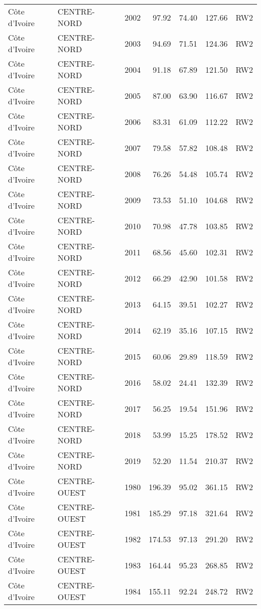 \begin{longtable}{lllrrrl}
  C\^{o}te d'Ivoire & CENTRE-NORD & 2002 & 97.92 & 74.40 & 127.66 & RW2 \\ 
  C\^{o}te d'Ivoire & CENTRE-NORD & 2003 & 94.69 & 71.51 & 124.36 & RW2 \\ 
  C\^{o}te d'Ivoire & CENTRE-NORD & 2004 & 91.18 & 67.89 & 121.50 & RW2 \\ 
  C\^{o}te d'Ivoire & CENTRE-NORD & 2005 & 87.00 & 63.90 & 116.67 & RW2 \\ 
  C\^{o}te d'Ivoire & CENTRE-NORD & 2006 & 83.31 & 61.09 & 112.22 & RW2 \\ 
  C\^{o}te d'Ivoire & CENTRE-NORD & 2007 & 79.58 & 57.82 & 108.48 & RW2 \\ 
  C\^{o}te d'Ivoire & CENTRE-NORD & 2008 & 76.26 & 54.48 & 105.74 & RW2 \\ 
  C\^{o}te d'Ivoire & CENTRE-NORD & 2009 & 73.53 & 51.10 & 104.68 & RW2 \\ 
  C\^{o}te d'Ivoire & CENTRE-NORD & 2010 & 70.98 & 47.78 & 103.85 & RW2 \\ 
  C\^{o}te d'Ivoire & CENTRE-NORD & 2011 & 68.56 & 45.60 & 102.31 & RW2 \\ 
  C\^{o}te d'Ivoire & CENTRE-NORD & 2012 & 66.29 & 42.90 & 101.58 & RW2 \\ 
  C\^{o}te d'Ivoire & CENTRE-NORD & 2013 & 64.15 & 39.51 & 102.27 & RW2 \\ 
  C\^{o}te d'Ivoire & CENTRE-NORD & 2014 & 62.19 & 35.16 & 107.15 & RW2 \\ 
  C\^{o}te d'Ivoire & CENTRE-NORD & 2015 & 60.06 & 29.89 & 118.59 & RW2 \\ 
  C\^{o}te d'Ivoire & CENTRE-NORD & 2016 & 58.02 & 24.41 & 132.39 & RW2 \\ 
  C\^{o}te d'Ivoire & CENTRE-NORD & 2017 & 56.25 & 19.54 & 151.96 & RW2 \\ 
  C\^{o}te d'Ivoire & CENTRE-NORD & 2018 & 53.99 & 15.25 & 178.52 & RW2 \\ 
  C\^{o}te d'Ivoire & CENTRE-NORD & 2019 & 52.20 & 11.54 & 210.37 & RW2 \\ 
  C\^{o}te d'Ivoire & CENTRE-OUEST & 1980 & 196.39 & 95.02 & 361.15 & RW2 \\ 
  C\^{o}te d'Ivoire & CENTRE-OUEST & 1981 & 185.29 & 97.18 & 321.64 & RW2 \\ 
  C\^{o}te d'Ivoire & CENTRE-OUEST & 1982 & 174.53 & 97.13 & 291.20 & RW2 \\ 
  C\^{o}te d'Ivoire & CENTRE-OUEST & 1983 & 164.44 & 95.23 & 268.85 & RW2 \\ 
  C\^{o}te d'Ivoire & CENTRE-OUEST & 1984 & 155.11 & 92.24 & 248.72 & RW2 \\ 

\end{longtable}
